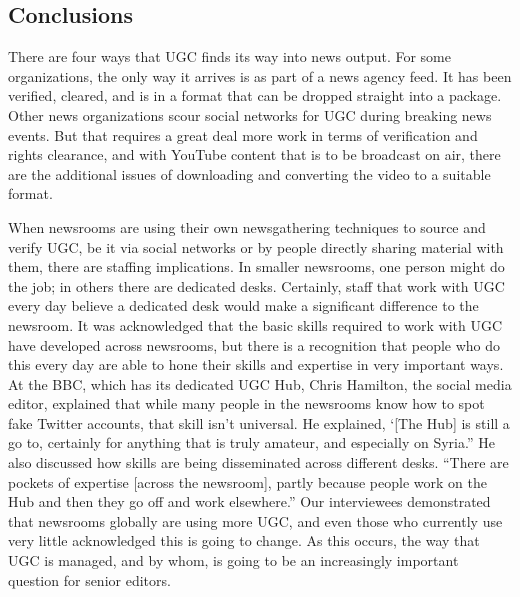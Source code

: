 \begin{enumerate}
\section{Conclusions}
There are four ways that UGC finds its way into news output. For some
organizations, the only way it arrives is as part of a news agency feed. It has
been verified, cleared, and is in a format that can be dropped straight into a
package. Other news organizations scour social networks for UGC during
breaking news events. But that requires a great deal more work in terms of
verification and rights clearance, and with YouTube content that is to be
broadcast on air, there are the additional issues of downloading and converting
the video to a suitable format.

When newsrooms are using their own newsgathering techniques to source
and verify UGC, be it via social networks or by people directly sharing
material with them, there are staffing implications. In smaller newsrooms,
one person might do the job; in others there are dedicated desks. Certainly,
staff that work with UGC every day believe a dedicated desk would make a
significant difference to the newsroom.
It was acknowledged that the basic skills required to work with UGC have
developed across newsrooms, but there is a recognition that people who
do this every day are able to hone their skills and expertise in very important
ways. At the BBC, which has its dedicated UGC Hub, Chris Hamilton,
the social media editor, explained that while many people in the newsrooms
know how to spot fake Twitter accounts, that skill isn't universal.
He explained, ‘[The Hub] is still a go to, certainly for anything that is truly
amateur, and especially on Syria.” He also discussed how skills are being
disseminated across different desks. ``There are pockets of expertise [across
the newsroom], partly because people work on the Hub and then they go
off and work elsewhere.''
Our interviewees demonstrated that newsrooms globally are using more
UGC, and even those who currently use very little acknowledged this is
going to change. As this occurs, the way that UGC is managed, and by
whom, is going to be an increasingly important question for senior editors.


\end{enumerate}
